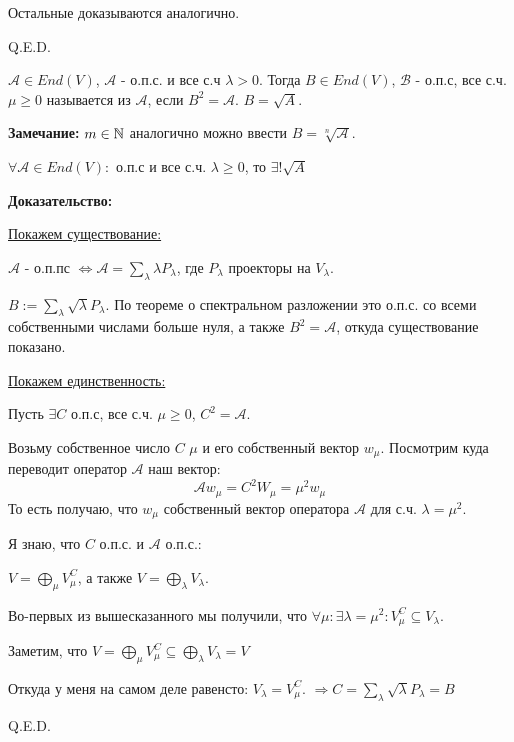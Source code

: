 Остальные доказываются аналогично.

\hfill Q.E.D.

 $\mathcal{A} \in End(V)$, $\mathcal{A}$ - о.п.с. и все с.ч $\lambda>0$. Тогда $B \in End(V)$, $\mathcal{B}$ - о.п.с, все с.ч. $\mu \geq 0$ называется  из $\mathcal{A}$, если $B^2 = \mathcal{A}$. $B = \sqrt{A}$.

\textbf{Замечание:} $m \in \mathbb{N}$ аналогично можно ввести $B =\sqrt[n]{\mathcal{A}}$.


$\forall \mathcal{A}\in End(V):$ о.п.с и все с.ч. $\lambda\geq0$, то $\exists! \sqrt{A}$

\textbf{Доказательство:}

\uline{Покажем существование:}

$\mathcal{A}$ - о.п.пс $\Leftrightarrow \mathcal{A} = \sum\limits_{\lambda}\lambda P_\lambda$, где $P_\lambda $ проекторы на $V_\lambda$. 

$B:= \sum\limits_{\lambda}\sqrt{\lambda} P_\lambda$. По теореме о спектральном разложении это о.п.с. со всеми собственными числами больше нуля, а также $B^2 = \mathcal{A}$, откуда существование показано.


\uline{Покажем единственность:}

Пусть $\exists C$ о.п.с, все с.ч. $\mu \geq 0$, $C^2 = \mathcal{A}$.

Возьму собственное число $C$ $\mu$  и его собственный вектор $w_\mu$. Посмотрим куда переводит оператор $\mathcal{A}$ наш вектор:
$$\mathcal{A} w_\mu = C^2 W_\mu = \mu^2 w_\mu$$
То есть получаю, что $w_\mu$ собственный вектор оператора $\mathcal{A}$ для с.ч. $\lambda = \mu^2$.

Я знаю, что $C$ о.п.с. и $\mathcal{A}$  о.п.с.:

$V = \bigoplus\limits_\mu V_\mu^C$, а также $V = \bigoplus\limits_\lambda V_\lambda$.

Во-первых из вышесказанного мы получили, что $\forall \mu: \exists \lambda = \mu^2: V_\mu^C \subseteq V_\lambda$.

Заметим, что $V = \bigoplus\limits_\mu V_\mu^C\subseteq 
\bigoplus\limits_{\lambda}V_\lambda = V$

Откуда у меня на самом деле равенсто: $V_\lambda = V_\mu ^C$. $\Rightarrow C = \sum\limits_\lambda \sqrt{\lambda} P_\lambda = B$

\hfill Q.E.D.


